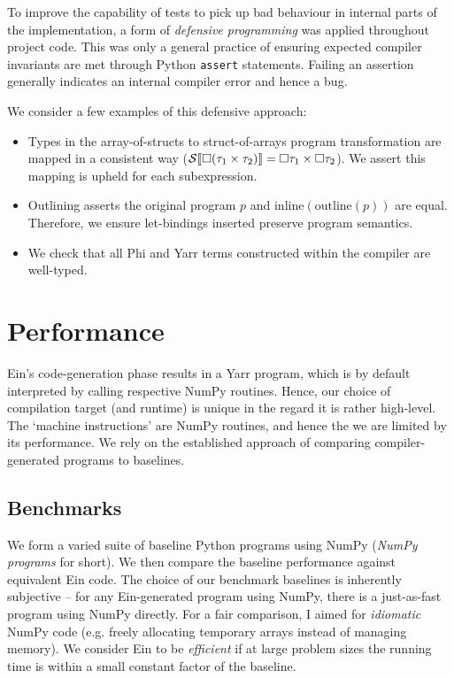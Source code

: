To improve the capability of tests to pick up bad behaviour in internal parts of the implementation, a form of \textit{defensive programming} was applied throughout project code.
This was only a general practice of ensuring expected compiler invariants are met through Python \texttt{assert} statements. Failing an assertion generally indicates an internal compiler error and hence a bug. 

\needspace{2em}
We consider a few examples of this defensive approach: \begin{itemize}
    \item Types in the array-of-structs to struct-of-arrays program transformation are mapped in a consistent way ($\phisoa{\phivectype{(\phipairtype{\tau_1}{\tau_2}})} = \phipairtype{\phivectype{\tau_1}}{\phivectype{\tau_2}}$). We assert this mapping is upheld for each subexpression.
    \item Outlining asserts the original program $p$ and $\mathrm{inline}(\mathrm{outline}(p))$ are equal. Therefore, we ensure let-bindings inserted preserve program semantics.
    \item We check that all Phi and Yarr terms constructed within the compiler are well-typed.
\end{itemize}

\section{Performance}

Ein's code-generation phase results in a Yarr program, which is by default interpreted by calling respective NumPy routines. 
Hence, our choice of compilation target (and runtime) is unique in the regard it is rather high-level.
The `machine instructions' are NumPy routines, and hence the we are limited by its performance. 
We rely on the established approach of comparing compiler-generated programs to baselines.
\subsection{Benchmarks}

\label{benchmarks}

We form a varied suite of baseline Python programs using NumPy (\textit{NumPy programs} for short). 
We then compare the baseline performance against equivalent Ein code.
The choice of our benchmark baselines is inherently subjective -- for any Ein-generated program using NumPy, there is a just-as-fast program using NumPy directly.
For a fair comparison, I aimed for \textit{idiomatic} NumPy code (e.g. freely allocating temporary arrays instead of managing memory).
We consider Ein to be \textit{efficient} if at large problem sizes the running time is within a small constant factor of the baseline. 


